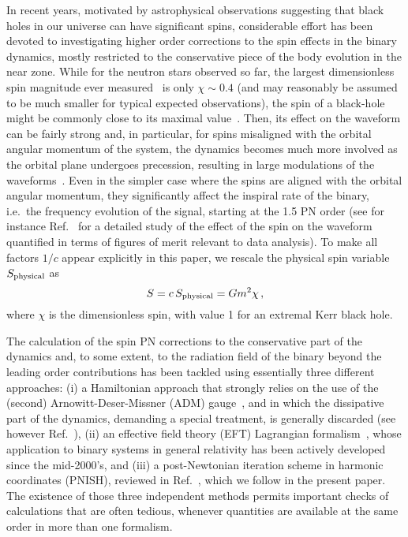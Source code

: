 \documentclass[
superscriptaddress,
preprint,
prd,tightenlines,showpacs,nofootinbib,
eqsecnum,
amsfonts,amsmath,amssymb]{revtex4-1}
\newcommand{\be}{\begin{equation}}
\newcommand{\ee}{\end{equation}}
\begin{document}
In recent years, motivated by astrophysical observations suggesting that black
holes in our universe can have significant spins, considerable effort has been
devoted to investigating higher order corrections to the spin effects in the
binary dynamics, mostly restricted to the conservative piece of the body
evolution in the near zone. While for the neutron stars observed so far, the
largest dimensionless spin magnitude ever measured~\cite{Hessels+06} is only
$\chi \sim 0.4$ (and may reasonably be assumed to be much smaller for
typical expected observations), the spin of a black-hole might be commonly
close to its maximal value~\cite{Gou+11,Nowak+12,Brenneman+11,Reynolds13}.
Then, its effect on the waveform can be fairly strong and, in particular, for
spins misaligned with the orbital angular momentum of the system, the dynamics
becomes much more involved as the orbital plane undergoes precession,
resulting in large modulations of the waveforms~\cite{K95,ACST94}. Even in the
simpler case where the spins are aligned with the orbital angular momentum,
they significantly affect the inspiral rate of the binary, i.e.\ the frequency
evolution of the signal, starting at the 1.5 PN order (see for instance
Ref.~\cite{Nitz+13} for a detailed study of the effect of the spin on the
waveform quantified in terms of figures of merit relevant to data analysis).
To make all factors $1/c$ appear explicitly in this paper, we rescale the
physical spin variable $S_{\rm physical}$ as
%
\be S=c\, S_{\rm physical}=Gm^2\chi \,,
\ee 
%
where $\chi$ is the dimensionless spin, with value 1 for an extremal Kerr
black hole.

The calculation of the spin PN corrections to the conservative part of the
dynamics and, to some extent, to the radiation field of the binary beyond the
leading order contributions has been tackled using essentially three different
approaches: (i) a Hamiltonian approach that strongly relies on the use of the
(second) Arnowitt-Deser-Missner (ADM) gauge~\cite{SS09a}, and in which the
dissipative part of the dynamics, demanding a special treatment, is generally
discarded (see however Ref.~\cite{WSZS11}), (ii) an effective field theory
(EFT) Lagrangian formalism~\cite{Porto06,PR08a}, whose application to binary
systems in general relativity has been actively developed since the
mid-2000's, and (iii) a post-Newtonian iteration scheme in harmonic
coordinates (PNISH), reviewed in Ref.~\cite{Bliving}, which we follow in the
present paper. The existence of those three independent methods permits
important checks of calculations that are often tedious, whenever quantities
are available at the same order in more than one formalism.
\end{document}
